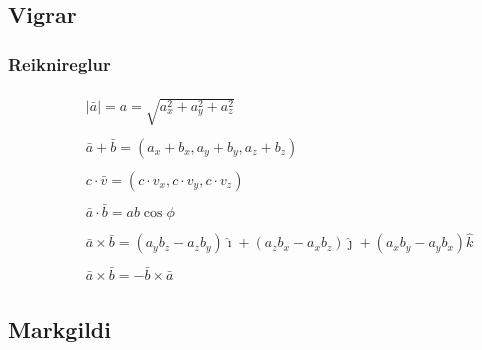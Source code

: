 \documentclass[a4paper,10pt,icelandic]{sphinxmanual}
\begin{document}
\subsection{Vigrar}
\label{\detokenize{Kafli12:vigrar}}

\subsubsection{Reiknireglur}
\label{\detokenize{Kafli12:reiknireglur}}\begin{equation*}
\begin{split}\begin{aligned}
& |\bar{a}| = a = \sqrt{a_x^2 + a_y^2 + a_z^2} \\
\qquad \\
& \bar{a} + \bar{b} = (a_x+b_x, a_y+b_y, a_z+b_z) \\
\qquad \\
& c \cdot \bar{v} = (c \cdot v_x, c \cdot v_y, c \cdot v_z) \\
\qquad \\
& \bar{a} \cdot \bar{b} = a b \cos{\phi} \\
\qquad \\
& \bar{a} \times \bar{b} = (a_y b_z - a_z b_y)\hat{\imath} + (a_z b_x - a_x b_z)\hat{\jmath} + (a_x b_y - a_y b_x)\hat{k} \\
\qquad \\
& \bar{a} \times \bar{b} = - \bar{b} \times \bar{a}
\end{aligned}\end{split}
\end{equation*}

\subsection{Markgildi}
\label{\detokenize{Kafli12:markgildi}}
\end{document}
